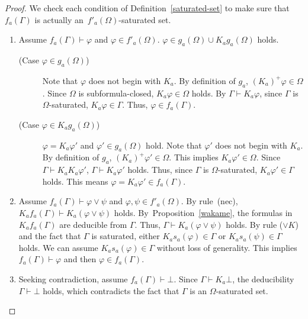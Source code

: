\documentclass[doctor]{iscs-thesis}
\begin{document}
\begin{proof}
 We check each condition of Definition~\ref{saturated-set} to make sure
 that $f_a(\Gamma)$ is
 actually an~$f'_a(\Omega)$-saturated set.
\begin{enumerate}
 \item Assume $f_a(\Gamma)\vdash\varphi$ and $\varphi\in f'_a(\Omega)$.
       $\varphi\in g_a(\Omega)\cup K_ag_a(\Omega)$ holds.
       \begin{description}
	\item[ (Case $\varphi\in g_a(\Omega)$)]
		   Note that $\varphi$ does not begin with $K_a$.
		   By definition of $g_a$,
		   $(K_a)^+\varphi\in\Omega$.
		   Since $\Omega$ is subformula-closed,
		   $K_a\varphi\in\Omega$ holds.
		   By $\Gamma\vdash K_a\varphi$, since $\Gamma$ is $\Omega$-saturated,
		   $K_a\varphi\in \Gamma$.
		   Thus, $\varphi\in f_a(\Gamma)$.
	\item[ (Case $\varphi\in K_ag_a(\Omega)$)]
		   $\varphi = K_a\varphi'$ and $\varphi'\in g_a(\Omega)$ hold.
		   Note that $\varphi'$ does not begin with $K_a$.
		   By definition of $g_a$,
		   $(K_a)^+\varphi'\in\Omega$.
		   This implies $K_a\varphi'\in\Omega$.
		   Since $\Gamma\vdash K_aK_a\varphi'$,
		   $\Gamma\vdash K_a\varphi'$ holds.
		   Thus, since $\Gamma$ is $\Omega$-saturated,
		   $K_a\varphi'\in \Gamma$ holds.
		   This means $\varphi = K_a\varphi' \in f_a(\Gamma)$.
       \end{description}
 \item Assume $f_a(\Gamma)\vdash\varphi\vee\psi$ and
       $\varphi,\psi\in f'_a(\Omega)$.
       By rule~(nec), $K_af_a(\Gamma)\vdash K_a(\varphi\vee\psi)$ holds.
       By~Proposition~\ref{wakame},
       the formulas in $K_af_a(\Gamma)$ are deducible from $\Gamma$.
       Thus, $\Gamma\vdash K_a(\varphi\vee\psi)$ holds.
       By rule ($\vee K$) and the fact that $\Gamma$ is saturated,
       either $K_as_a(\varphi)\in\Gamma$ or $K_as_a(\psi)\in\Gamma$ holds.
       We can assume $K_as_a(\varphi)\in\Gamma$ without loss of generality.
       This implies $f_a(\Gamma)\vdash\varphi$ and then
       $\varphi\in f_a(\Gamma)$.
 \item Seeking contradiction, assume $f_a(\Gamma)\vdash\bot$.
       Since $\Gamma\vdash K_a\bot$, the deducibility
       $\Gamma\vdash\bot$ holds, which contradicts the fact that
       $\Gamma$ is an $\Omega$-saturated set.
\end{enumerate}
\end{proof}

\newcommand{\natpls}{{\mathbb N}^{+}}
\end{document}
